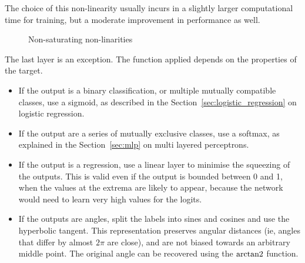 The choice of this non-linearity usually incurs in a slightly larger computational time for training, but a moderate improvement in performance as well.

\begin{figure}[tb]
	\hfil
	\caption{Non-saturating non-linarities}\label{fig:non_linear2}
\end{figure}

The last layer is an exception.
The function applied depends on the properties of the target.
\begin{itemize}
\item If the output is a binary classification, or multiple mutually compatible classes, use a sigmoid, as described in the Section~\ref{sec:logistic_regression} on logistic regression.
\item If the output are a series of mutually exclusive classes, use a softmax, as explained in the Section~\ref{sec:mlp} on multi layered perceptrons.
\item If the output is a regression, use a linear layer to minimise the squeezing of the outputs.
This is valid even if the output is bounded between 0 and 1, when the values at the extrema are likely to appear, because the network would need to learn very high values for the logits.
\item If the outputs are angles, split the labels into sines and cosines and use the hyperbolic tangent.
This representation preserves angular distances (ie, angles that differ by almost $2 \pi$ are close), and are not biased towards an arbitrary middle point.
The original angle can be recovered using the $\operatorname{arctan2}$ function.
\end{itemize}

